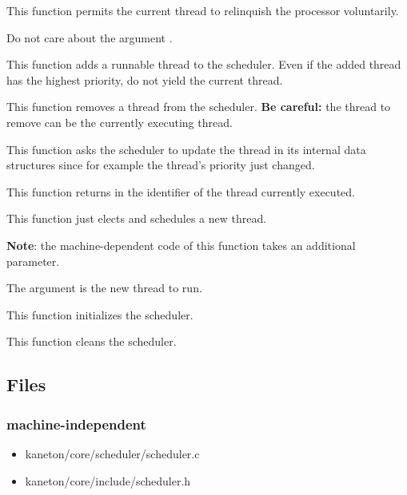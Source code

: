 {
  This function permits the current thread to relinquish
  the processor voluntarily.

  Do not care about the argument .
}

{
  This function adds a runnable thread to the scheduler. Even
  if the added thread has the highest priority, do not yield
  the current thread.
}

{
  This function removes a thread from the
  scheduler. \textbf{Be careful:} the thread to remove can be
  the currently executing thread.
}

{
  This function asks the scheduler to update the thread
   in its internal data structures since
  for example the thread's priority just changed.
}

{
  This function returns in  the identifier
  of the thread currently executed.
}

{
  This function just elects and schedules a new thread.

  \textbf{Note}: the machine-dependent code of this function
  takes an additional parameter.

  {
    The argument  is the new
    thread to run.
  }
}

{
  This function initializes the scheduler.
}

{
  This function cleans the scheduler.
}

\subsection*{Files}

\subsubsection{\color{filerefcolor} machine-independent}
\begin{itemize}
\item kaneton/core/scheduler/scheduler.c
\item kaneton/core/include/scheduler.h
\end{itemize}

